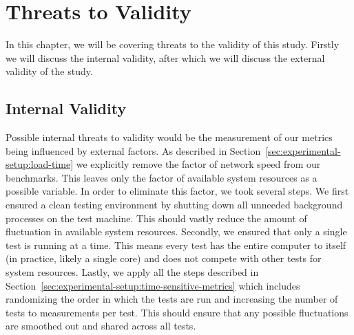 \chapter{Threats to Validity}\label{chap:threats-to-validity}

In this chapter, we will be covering threats to the validity of this study. Firstly we will discuss the internal validity, after which we will discuss the external validity of the study.

\section{Internal Validity}
Possible internal threats to validity would be the measurement of our metrics being influenced by external factors. As described in Section~\ref{sec:experimental-setup:load-time} we explicitly remove the factor of network speed from our benchmarks. This leaves only the factor of available system resources as a possible variable. In order to eliminate this factor, we took several steps. We first ensured a clean testing environment by shutting down all unneeded background processes on the test machine. This should vastly reduce the amount of fluctuation in available system resources. Secondly, we ensured that only a single test is running at a time. This means every test has the entire computer to itself (in practice, likely a single core) and does not compete with other tests for system resources. Lastly, we apply all the steps described in Section~\ref{sec:experimental-setup:time-sensitive-metrics} which includes randomizing the order in which the tests are run and increasing the number of tests to \numMeasures{} measurements per test. This should ensure that any possible fluctuations are smoothed out and shared across all tests.

